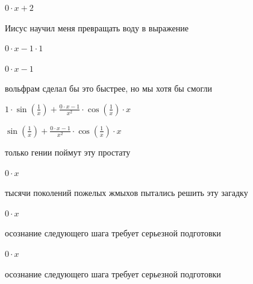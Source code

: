 \documentclass[a4paper,12pt]{article}
\begin{document}
\begin{center}$0 \cdot x+2$

\end{center}

Иисус научил меня превращать воду в выражение 



\begin{center}$0 \cdot x-1 \cdot 1$

\end{center}



\begin{center}$0 \cdot x-1$

\end{center}

вольфрам сделал бы это быстрее, но мы хотя бы смогли 



\begin{center}$1 \cdot  \sin ( \frac{1}{x} )+ \frac{0 \cdot x-1}{x^{2}}  \cdot  \cos ( \frac{1}{x} ) \cdot x$

\end{center}



\begin{center}$ \sin ( \frac{1}{x} )+ \frac{0 \cdot x-1}{x^{2}}  \cdot  \cos ( \frac{1}{x} ) \cdot x$

\end{center}

только гении поймут эту простату 



\begin{center}$0 \cdot x$

\end{center}

тысячи поколений пожелых жмыхов пытались решить эту загадку 



\begin{center}$0 \cdot x$

\end{center}

осознание следующего шага требует серьезной подготовки 



\begin{center}$0 \cdot x$

\end{center}

осознание следующего шага требует серьезной подготовки 
\end{document}
